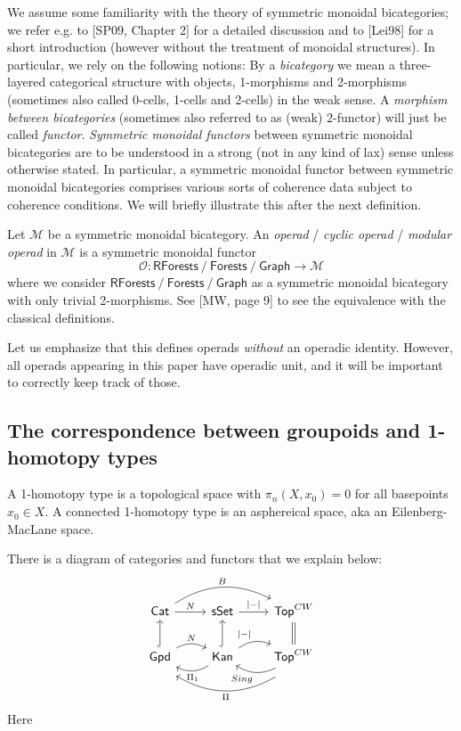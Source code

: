 \documentclass[11pt]{article}
\theoremstyle{definition}
\begin{document}
We assume some familiarity with the theory of symmetric monoidal bicategories; we refer e.g. to [SP09, Chapter 2] for a detailed discussion and to [Lei98] for a short introduction (however without the treatment of monoidal structures). In particular, we rely on the following notions: By a \emph{bicategory} we mean a three-layered categorical structure with objects, 1-morphisms and 2-morphisms (sometimes also called 0-cells, 1-cells and 2-cells) in the weak sense. A \emph{morphism between bicategories} (sometimes also referred to as (weak) 2-functor) will just be called \emph{functor}. \emph{Symmetric monoidal functors} between symmetric monoidal bicategories are to be understood in a strong (not in any kind of lax) sense unless otherwise stated. In particular, a symmetric monoidal functor between symmetric monoidal bicategories comprises various sorts of coherence data subject to coherence conditions. We will briefly illustrate this after the next definition.


Let $\mathcal{M}$ be a symmetric monoidal bicategory. An \emph{operad} / \emph{cyclic operad} / \emph{modular operad}  in $\mathcal{M}$ is a symmetric monoidal functor $$\mathcal{O} : \mathsf{RForests} \ / \ \mathsf{Forests}  \ / \ \mathsf{Graph} \to \mathcal{M}$$ where we consider $\mathsf{RForests} \ / \ \mathsf{Forests}  \ / \ \mathsf{Graph}$ as a symmetric monoidal bicategory with only trivial 2-morphisms. See [MW, page 9] to see the equivalence with the classical definitions.

Let us emphasize that this defines operads \emph{without} an operadic identity. However, all operads appearing in this paper have operadic unit, and it will be important to correctly keep track of those. 




\subsection{The correspondence between groupoids and 1-homotopy types}

A 1-homotopy type is a topological space with $\pi_n(X,x_0)=0$ for all basepoints $x_0 \in X$. A connected 1-homotopy type is an asphereical space, aka an Eilenberg-MacLane space.


There is a diagram of categories and functors that we explain below:
$$\begin{tikzcd}
    \mathsf{Cat} \rar{N} \arrow[rr,bend left, "B"] & \mathsf{sSet} \rar{|-|} & \mathsf{Top}^{CW} \arrow[equals]{d} \\
  \mathsf{Gpd} \arrow[hook]{u}  \arrow[r,bend left, "N"]  & \mathsf{Kan}  \arrow[r,bend left, "|-|"]  \arrow[hook]{u} \arrow[l,bend left, "\Pi_1"] & \mathsf{Top}^{CW} \arrow[l,bend left, "Sing"] \arrow[ll,bend left, shift left=3, "\Pi"]
\end{tikzcd}$$
Here
\end{document}
